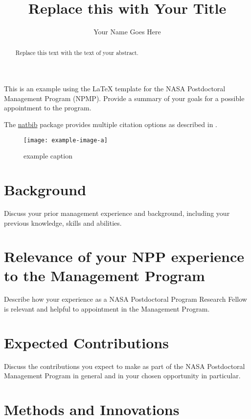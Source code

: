 \documentclass[final,letterpaper,oneside,12pt]{article}
\title{Replace this with Your Title}  %
\author{Your Name Goes Here}  %
\begin{document}
\maketitle

\begin{abstract}
	Replace this text with the text of your abstract.
\end{abstract}

This is an example using the \LaTeX{} template for the NASA Postdoctoral Management Program (NPMP).  Provide a summary of your goals for a possible appointment to the program.

The \href{http://merkel.texture.rocks/Latex/natbib.php}{natbib} package provides multiple citation options as described in \citet{natbib:2010}.

\begin{figure}[htbp] %
   \centering
   \texttt{[image: example-image-a]}
   \caption{example caption}
   \label{fig:example}
\end{figure}

\section{Background}

Discuss your prior management experience and background, including your previous knowledge, skills and abilities.

\section{Relevance of your NPP experience to the Management Program}

Describe how your experience as a NASA Postdoctoral Program Research Fellow is relevant and helpful to appointment in the Management Program.

\section{Expected Contributions}

Discuss the contributions you expect to make as part of the NASA Postdoctoral Management Program in general and in your chosen opportunity in particular.

\section{ Methods and Innovations}
\end{document}
